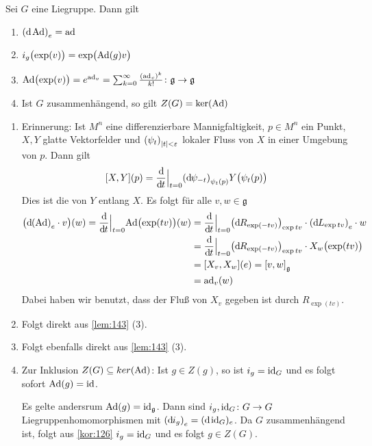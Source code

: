 \begin{lemma}[{name=[Eigenschaften von $\Ad$ und $\ad$]},label=lem:153]
	Sei $G$ eine Liegruppe.
	Dann gilt
	\begin{enumerate}[(1)]
		\item $\enbrace*{\mathd \Ad}_{e} = \ad$
		\item $i_g \enbrace[\big]{\exp(v)} = \exp \enbrace[\big]{\Ad(g)v}$
		\item $\Ad \enbrace[\big]{\exp(v)} = e^{\ad_v} = \sum_{k=0}^{\infty} \frac{(\ad_v)^k}{k!} \colon \mathfrak{g} \to \mathfrak{g}$
		\item Ist $G$ zusammenhängend, so gilt $Z(G) = \ker (\Ad)$
	\end{enumerate}
\end{lemma}
\begin{beweis}
	\begin{enumerate}[(1)]
		\item Erinnerung: Ist $M^n$ eine differenzierbare Mannigfaltigkeit, $p \in M^n$ ein Punkt, $X,Y$ glatte Vektorfelder und $\enbrace*{\psi_t}_{\abs*{t}<\varepsilon}$ lokaler Fluss von $X$ in einer Umgebung von $p$.
		Dann gilt
		\[
			\benbrace*{X,Y}(p) = \diffd{}{t}\Big|_{t=0} \enbrace*{\mathd \psi_{-t}}_{\psi_t(p)} Y \enbrace[\big]{\psi_t(p)}
		\]
		Dies ist die  von $Y$ entlang $X$. 
		Es folgt für alle $v,w \in \mathfrak{g}$
		\begin{align}
			\enbrace[\big]{\mathd \enbrace*{\Ad}_{e} \cdot v} (w) = \diffd{}{t}\Big|_{t=0} \!\Ad \enbrace[\big]{\exp(tv)}(w) &= \diffd{}{t}\Big|_{t=0} \enbrace*{\mathd R_{\exp(-tv)}}_{\exp{tv}} \cdot  \enbrace*{\mathd L_{\exp tv}}_{e} \cdot w \\
			&= \diffd{}{t}\Big|_{t=0} \enbrace*{\mathd R_{\exp(-tv)}}_{\exp{tv}} \cdot X_w \enbrace[\big]{\exp(tv)} \\
			&= \benbrace*{X_v,X_w}(e)  = \benbrace*{v,w}_{\mathfrak{g}} \\
			&= \ad_v(w)
		\end{align}
		Dabei haben wir benutzt, dass der Fluß von $X_v$ gegeben ist durch $R_{\exp(tv)}$.
		\item Folgt direkt aus \autoref{lem:143} (3).
		\item Folgt ebenfalls direkt aus \autoref{lem:143} (3).
		\item Zur Inklusion $Z(G) \subseteq ker (\Ad)$: Ist $g \in Z(g)$, so ist $i_g = {\id_G} $ und es folgt sofort $\Ad(g)=\id$.
		
		Es gelte andersrum $\Ad(g) = \id_{\mathfrak{g}}$.
		Dann sind $i_g, \id_G \colon G \to G$ Liegruppenhomomorphismen mit $\enbrace*{\mathd i_g}_e = (\mathd\id_G)_e$.
		Da $G$ zusammenhängend ist, folgt aus \autoref{kor:126} $i_g=\id_G$ und es folgt $g \in Z(G)$.\qedhere 
	\end{enumerate}
\end{beweis}

